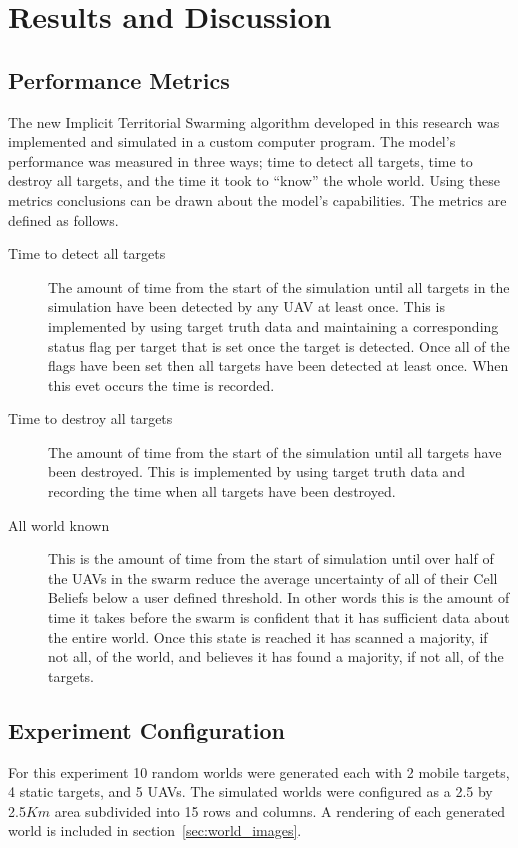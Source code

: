 \chapter{Results and Discussion}
\label{chap:results}

\section{Performance Metrics}
The new Implicit Territorial Swarming algorithm developed in this research was implemented and simulated in a custom computer program.  The model's performance was measured in three ways; time to detect all targets, time to destroy all targets, and the time it took to ``know'' the whole world.  Using these metrics conclusions can be drawn about the model's capabilities.  The metrics are defined as follows.

\begin{description}
	\item [Time to detect all targets] The amount of time from the start of the simulation until all targets in the simulation have been detected by any UAV at least once.  This is implemented by using target truth data and maintaining a corresponding status flag per target that is set once the target is detected.  Once all of the flags have been set then all targets have been detected at least once.  When this evet occurs the time is recorded.
	
	\item[Time to destroy all targets] The amount of time from the start of the simulation until all targets have been destroyed.  This is implemented by using target truth data and recording the time when all targets have been destroyed.
	
	\item[All world known] This is the amount of time from the start of simulation until over half of the UAVs in the swarm reduce the average uncertainty of all of their Cell Beliefs below a user defined threshold.  In other words this is the amount of time it takes before the swarm is confident that it has sufficient data about the entire world.  Once this state is reached it has scanned a majority, if not all, of the world, and believes it has found a majority, if not all, of the targets.
\end{description}


\section{Experiment Configuration}
For this experiment 10 random worlds were generated each with 2 mobile targets, 4 static targets, and 5 UAVs.  The simulated worlds were configured as a 2.5 by 2.5$Km$ area subdivided into 15 rows and columns.  A rendering of each generated world is included in section~\ref{sec:world_images}.

